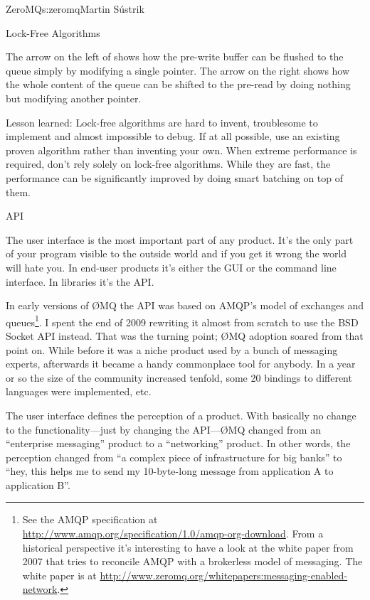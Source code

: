 \begin{aosachapter}{ZeroMQ}{s:zeromq}{Martin S\'{u}strik}
\begin{aosasect1}{Lock-Free Algorithms}

The arrow on the left of  shows how
the pre-write buffer can be flushed to the queue simply by modifying a
single pointer. The arrow on the right shows how the whole content of the
queue can be shifted to the pre-read by doing nothing but modifying
another pointer.

Lesson learned: Lock-free algorithms are hard to invent, troublesome
to implement and almost impossible to debug. If at all possible, use
an existing proven algorithm rather than inventing your own. When
extreme performance is required, don't rely solely on lock-free
algorithms. While they are fast, the performance can be significantly
improved by doing smart batching on top of them.

\end{aosasect1}

\begin{aosasect1}{API}

The user interface is the most important part of any product. It's the
only part of your program visible to the outside world and if you get
it wrong the world will hate you. In end-user products it's either the GUI
or the command line interface. In libraries it's the API.

In early versions of {\O}MQ the API was based on AMQP's model of
exchanges and queues\footnote{See the AMQP specification at
  \url{http://www.amqp.org/specification/1.0/amqp-org-download}. From a 
  historical perspective it's interesting to have a look at the
  white paper from 2007 that tries to reconcile AMQP with a brokerless
  model of messaging. The white paper is at
  \url{http://www.zeromq.org/whitepapers:messaging-enabled-network}.}. I
spent the end of 2009 rewriting it almost from scratch to use the BSD
Socket
API
instead. That was the turning point; {\O}MQ adoption soared from that
point on. While before it was a niche product used by a bunch of
messaging experts, afterwards it became a handy commonplace tool for
anybody. In a year or so the size of the community increased tenfold,
some 20 bindings to different languages were implemented, etc.

The user interface defines the perception of a product. With basically
no change to the functionality---just by changing the API---{\O}MQ 
changed from an ``enterprise messaging'' product to a ``networking''
product. In other words, the perception changed from ``a complex piece
of infrastructure for big banks'' to ``hey, this helps me to send my
10-byte-long message from application A to application B''.


\end{aosasect1}
\end{aosachapter}
